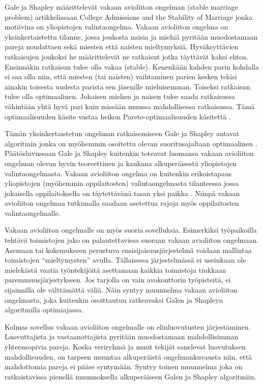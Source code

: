 \documentclass[gradu, twoside]{tktltiki}
\begin{document}
Gale ja Shapley määrittelevät vakaan avioliiton ongelman (stable
marriage problem) artikkelissaan College Admissions and the Stability
of Marriage \cite{galeshapley62} jonka motiivina on yliopistojen
valintaongelma. Vakaan avioliiton ongelma on yksinkertaistettu
tilanne, jossa joukosta naisia ja miehiä pyritään muodostamaan pareja
noudattaen sekä miesten että naisten mieltymyksiä. Hyväksyttävien
ratkaisujen joukoksi he määrittelevät ne ratkaisut jotka täyttävät
kaksi ehtoa. Ensinnäkin ratkaisun tulee olla vakaa (stable). Kenenkään
kahden parin kohdalla ei saa olla niin, että miesten (tai naisten)
vaihtaminen parien kesken tekisi ainakin toisesta uudesta parista sen
jäsenille mieluisemman. Toiseksi ratkaisun tulee olla optimaalinen.
Jokaisen miehen ja naisen tulee saada ratkaisussa vähintään yhtä hyvä
pari kuin missään muussa mahdollisessa ratkaisussa. Tämä
optimaalisuuden käsite vastaa heikon Pareto-optimaalisuuden käsitettä
\cite{gusfield89}.

Tämän yksinkertaistetun ongelman ratkaisemiseen Gale ja Shapley
antavat algoritmin jonka on myöhemmin osoitettu olevan
suoritusajaltaan optimaalinen \cite{gusfield89, cheng89}.
Päätösluvussaan Gale ja Shapley kuitenkin toteavat luomansa vakaan
avioliiton ongelman olevan hyvin teoreettinen ja kaukana
alkuperäisestä yliopistojen valintaongelmasta. Vakaan avioliiton
ongelma on kuitenkin erikoistapaus yliopistojen (myöhemmin
oppilaitosten) valintaongelmasta tilanteessa jossa jokaisella
oppilaitoksella on täytettävänä tasan yksi paikka \cite{manlove02}.
Niinpä vakaan avioliiton ongelmaa tutkimalla saadaan asetettua rajoja
myös oppilaitosten valintaongelmalle.

Vakaan avioliiton ongelmalle on myös suoria sovelluksia. Esimerkiksi
työpaikoilla tehtävä toimistojen jako on palautettavissa suoraan
vakaan avioliiton ongelmaan. Asemaan tai kokemukseen perustuva
ensisijaisuusjärjestelmä voidaan mallintaa toimistojen
``mieltymysten'' avulla. Tällaisessa järjestelmässä ei useinkaan ole
mielekästä vaatia työntekijöitä asettamaan kaikkia toimistoja tiukkaan
paremmuusjärjestykseen. Jos tarjolla on vain avokonttorin työpisteitä,
ei sijainnilla ole välttämättä väliä. Näin syntyy muunnelma vakaan
avioliiton ongelmasta, joka kuitenkin osoittautuu ratkeavaksi Galen ja
Shapleyn algoritmilla optimiajassa.

Kolmas sovellus vakaan avioliiton ongelmalle on elinluovutusten
järjestäminen. Luovuttajista ja vastaanottajista pyritään muodostamaan
mahdollisimman yhteensopivia pareja. Koska veriryhmä ja muut tekijät
sanelevat luovutuksen mahdollisuuden, on tarpeen muuntaa alkuperäistä
ongelmankuvausta niin, että mahdottomia pareja ei pääse syntymään.
Syntyy toinen muunnelma joka on ratkaistavissa pienellä muunnoksella
alkuperäiseen Galen ja Shapley algoritmiin.
\end{document}
